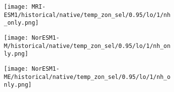 \documentclass[preview]{standalone}
\begin{document}
\begin{figure}
  \begin{subfigure}[t]{\textwidth}
    \texttt{[image: MRI-ESM1/historical/native/temp\_zon\_sel/0.95/lo/1/nh\_only.png]}
  \end{subfigure}
\end{figure}

\begin{figure}
  \begin{subfigure}[t]{\textwidth}
    \texttt{[image: NorESM1-M/historical/native/temp\_zon\_sel/0.95/lo/1/nh\_only.png]}
  \end{subfigure}
\end{figure}

\begin{figure}
  \begin{subfigure}[t]{\textwidth}
    \texttt{[image: NorESM1-ME/historical/native/temp\_zon\_sel/0.95/lo/1/nh\_only.png]}
  \end{subfigure}
\end{figure}
\end{document}
